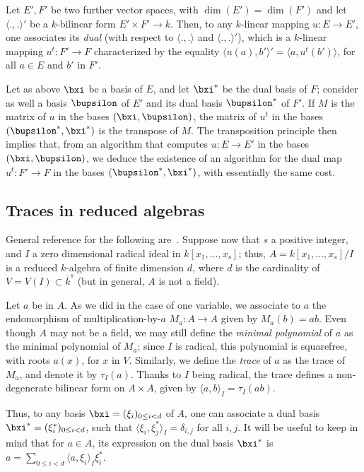 \documentclass{sig-alternate}
\newcounter{algo}
\newcommand{\ang}[1]{\langle#1\rangle}
\begin{document}
Let $E',F'$ be two further vector spaces, with $\dim(E')=\dim(F')$ and
let $\ang{.,.}'$ be a $k$-bilinear form $E'\times F' \to k$. Then, to
any $k$-linear mapping $u:E\to E'$, one associates its {\em dual}
(with respect to $\ang{.,.}$ and $\ang{.,.}'$), which is a $k$-linear
mapping $u^t: F' \to F$ characterized by the equality
$\ang{u(a),b'}'=\ang{a,u^t(b')}$, for all $a\in E$ and $b'$ in $F'$.

Let as above $\bxi$ be a basis of $E$, and let $\bxi^\ast$ be
the dual basis of $F$; consider as well a basis $\bupsilon$ of $E'$ and
its dual basis $\bupsilon^\ast$ of $F'$. If $M$ is the matrix of $u$ in
the bases $(\bxi,\bupsilon)$, the matrix of $u^t$ in the bases
$(\bupsilon^\ast,\bxi^\ast)$ is the transpose of $M$. The
transposition principle then implies that, from an algorithm that
computes $u: E \to E'$ in the bases $(\bxi,\bupsilon)$, we deduce the
existence of an algorithm for the dual map $u^t: F' \to F$ in the
bases $(\bupsilon^\ast,\bxi^\ast)$, with essentially the same cost.


\subsection{Traces in reduced algebras}

General reference for the following
are~\cite{Kunz86,Cox-Little-OShea:UAG2005}. Suppose now that $s$ a
positive integer, and $I$ a zero dimensional radical ideal in
$k[x_1,\dots,x_s]$; thus, $A=k[x_1,\dots,x_s]/I$ is a reduced
$k$-algebra of finite dimension $d$, where $d$ is the cardinality of
$V=V(I) \subset\overline{k}^s$ (but in general, $A$ is not a field).

Let $a$ be in $A$. As we did in the case of one variable, we associate
to $a$ the endomorphism of multiplication-by-$a$ $M_a: A \to A$ given
by $M_a(b)=ab$.  Even though $A$ may not be a field, we may still
define the {\em minimal polynomial} of $a$ as the minimal polynomial
of $M_a$; since $I$ is radical, this polynomial is squarefree, with
roots $a(x)$, for $x$ in $V$. Similarly, we define the \emph{trace} of
$a$ as the trace of $M_a$, and denote it by $\tau_I(a)$. Thanks to $I$
being radical, the trace defines a non-degenerate bilinear form on
$A\times A$, given by $\ang{a,b}_I = \tau_I(ab)$.

Thus, to any basis $\bxi=(\xi_i)_{0 \le i < d}$ of $A$, one can
associate a dual basis $\bxi^\ast=(\xi^\ast_i)_{0 \le i < d}$,
such that $\ang{\xi_i, \xi^\ast_j}_I=\delta_{i,j}$ for all
$i,j$.  It will be useful to keep in mind that for $a \in A$, its
expression on the dual basis $\bxi^\ast$ is $a=\sum_{0 \le i < d}
\ang{a,\xi_i}_I \xi^\ast_i$.
\end{document}
